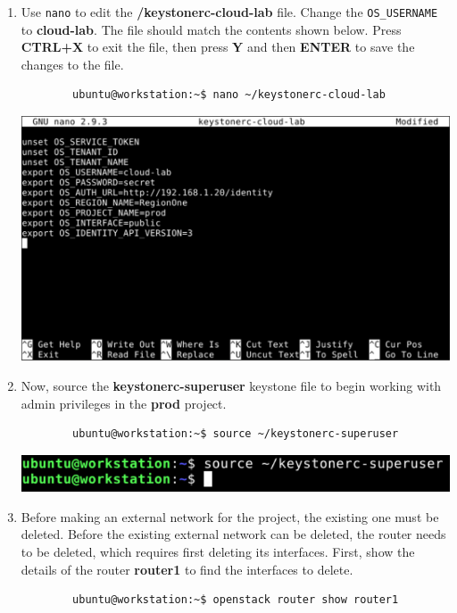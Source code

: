 \documentclass[letterpaper, 12pt]{article}
\begin{document}
\begin{enumerate}
    \item Use \texttt{nano} to edit the \textbf{\texttildemid/keystonerc-cloud-lab} file. Change the
    \texttt{OS\_USERNAME} to \textbf{cloud-lab}. The file should match the contents shown below. Press \textbf{CTRL+X}
    to exit the file, then press \textbf{Y} and then \textbf{ENTER} to save the changes to the file.
    \begin{lstlisting}
        ubuntu@workstation:~$ nano ~/keystonerc-cloud-lab
    \end{lstlisting}

    \begin{center}
        \includegraphics[width=\linewidth]{images/part1/step12.png}
    \end{center}

    \item Now, source the \textbf{keystonerc-superuser} keystone file to begin working with admin privileges in the
    \textbf{prod} project.
    \begin{lstlisting}
        ubuntu@workstation:~$ source ~/keystonerc-superuser
    \end{lstlisting}

    \begin{center}
        \includegraphics[width=\linewidth]{images/part1/step13.png}
    \end{center}

    \item Before making an external network for the project, the existing one must be deleted. Before the existing
    external network can be deleted, the router needs to be deleted, which requires first deleting its interfaces.
    First, show the details of the router \textbf{router1} to find the interfaces to delete.
    \begin{lstlisting}
        ubuntu@workstation:~$ openstack router show router1
    \end{lstlisting}


\end{enumerate}
\end{document}
